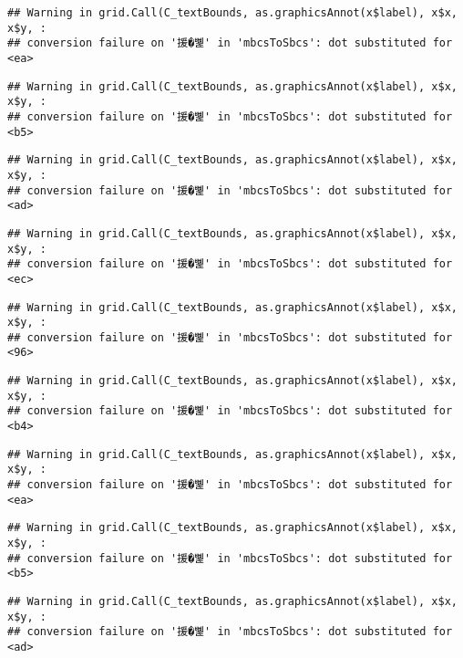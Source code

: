 \documentclass[
]{article}
\begin{document}
\begin{verbatim}
## Warning in grid.Call(C_textBounds, as.graphicsAnnot(x$label), x$x, x$y, :
## conversion failure on '援�뼱' in 'mbcsToSbcs': dot substituted for <ea>
\end{verbatim}

\begin{verbatim}
## Warning in grid.Call(C_textBounds, as.graphicsAnnot(x$label), x$x, x$y, :
## conversion failure on '援�뼱' in 'mbcsToSbcs': dot substituted for <b5>
\end{verbatim}

\begin{verbatim}
## Warning in grid.Call(C_textBounds, as.graphicsAnnot(x$label), x$x, x$y, :
## conversion failure on '援�뼱' in 'mbcsToSbcs': dot substituted for <ad>
\end{verbatim}

\begin{verbatim}
## Warning in grid.Call(C_textBounds, as.graphicsAnnot(x$label), x$x, x$y, :
## conversion failure on '援�뼱' in 'mbcsToSbcs': dot substituted for <ec>
\end{verbatim}

\begin{verbatim}
## Warning in grid.Call(C_textBounds, as.graphicsAnnot(x$label), x$x, x$y, :
## conversion failure on '援�뼱' in 'mbcsToSbcs': dot substituted for <96>
\end{verbatim}

\begin{verbatim}
## Warning in grid.Call(C_textBounds, as.graphicsAnnot(x$label), x$x, x$y, :
## conversion failure on '援�뼱' in 'mbcsToSbcs': dot substituted for <b4>
\end{verbatim}

\begin{verbatim}
## Warning in grid.Call(C_textBounds, as.graphicsAnnot(x$label), x$x, x$y, :
## conversion failure on '援�뼱' in 'mbcsToSbcs': dot substituted for <ea>
\end{verbatim}

\begin{verbatim}
## Warning in grid.Call(C_textBounds, as.graphicsAnnot(x$label), x$x, x$y, :
## conversion failure on '援�뼱' in 'mbcsToSbcs': dot substituted for <b5>
\end{verbatim}

\begin{verbatim}
## Warning in grid.Call(C_textBounds, as.graphicsAnnot(x$label), x$x, x$y, :
## conversion failure on '援�뼱' in 'mbcsToSbcs': dot substituted for <ad>
\end{verbatim}
\end{document}
